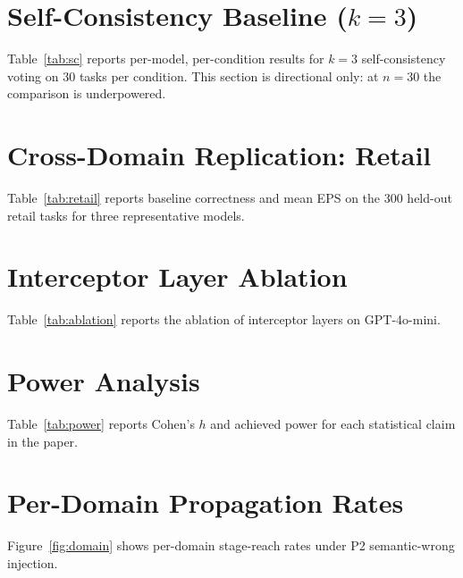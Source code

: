 \documentclass[11pt]{article}
\begin{document}
\section{Self-Consistency Baseline ($k{=}3$)}

Table~\ref{tab:sc} reports per-model, per-condition results for $k{=}3$
self-consistency voting on 30 tasks per condition.
This section is directional only: at $n{=}30$ the comparison is
underpowered.



\section{Cross-Domain Replication: Retail}

Table~\ref{tab:retail} reports baseline correctness and mean EPS on the
300 held-out retail tasks for three representative models.



\section{Interceptor Layer Ablation}

Table~\ref{tab:ablation} reports the ablation of interceptor layers on
GPT-4o-mini.



\section{Power Analysis}

Table~\ref{tab:power} reports Cohen's $h$ and achieved power for each
statistical claim in the paper.



\section{Per-Domain Propagation Rates}

Figure~\ref{fig:domain} shows per-domain stage-reach rates under P2
semantic-wrong injection.
\end{document}
